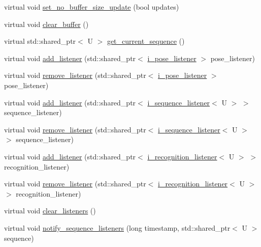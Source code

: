 \begin{DoxyCompactItemize}
\item 
virtual void \hyperlink{classmae_1_1movement__controller_a32f047751311a4e179d7cdad365bcadc}{set\-\_\-no\-\_\-buffer\-\_\-size\-\_\-update} (bool updates)
\item 
virtual void \hyperlink{classmae_1_1movement__controller_a694dc82c3222059711fa3a2ac6eb8ec2}{clear\-\_\-buffer} ()
\item 
virtual std\-::shared\-\_\-ptr$<$ U $>$ \hyperlink{classmae_1_1movement__controller_a1ce565a08a9b4efdee6b2f00b02e33e1}{get\-\_\-current\-\_\-sequence} ()
\item 
virtual void \hyperlink{classmae_1_1movement__controller_a7a150591c820312528d5b11e32646455}{add\-\_\-listener} (std\-::shared\-\_\-ptr$<$ \hyperlink{classmae_1_1i__pose__listener}{i\-\_\-pose\-\_\-listener} $>$ pose\-\_\-listener)
\item 
virtual void \hyperlink{classmae_1_1movement__controller_a5d77a42ac7427ae562d042ebbc6ce30b}{remove\-\_\-listener} (std\-::shared\-\_\-ptr$<$ \hyperlink{classmae_1_1i__pose__listener}{i\-\_\-pose\-\_\-listener} $>$ pose\-\_\-listener)
\item 
virtual void \hyperlink{classmae_1_1movement__controller_ade907e35d832e9ec5ec6fc2797df882f}{add\-\_\-listener} (std\-::shared\-\_\-ptr$<$ \hyperlink{classmae_1_1i__sequence__listener}{i\-\_\-sequence\-\_\-listener}$<$ U $>$ $>$ sequence\-\_\-listener)
\item 
virtual void \hyperlink{classmae_1_1movement__controller_af8e7fed43a0b64d09b7fbb22052ba635}{remove\-\_\-listener} (std\-::shared\-\_\-ptr$<$ \hyperlink{classmae_1_1i__sequence__listener}{i\-\_\-sequence\-\_\-listener}$<$ U $>$ $>$ sequence\-\_\-listener)
\item 
virtual void \hyperlink{classmae_1_1movement__controller_a80b292e1a12f916de2d167f22871c901}{add\-\_\-listener} (std\-::shared\-\_\-ptr$<$ \hyperlink{classmae_1_1i__recognition__listener}{i\-\_\-recognition\-\_\-listener}$<$ U $>$ $>$ recognition\-\_\-listener)
\item 
virtual void \hyperlink{classmae_1_1movement__controller_aafbffa6c9a0d2b73b2036f07c484b6cf}{remove\-\_\-listener} (std\-::shared\-\_\-ptr$<$ \hyperlink{classmae_1_1i__recognition__listener}{i\-\_\-recognition\-\_\-listener}$<$ U $>$ $>$ recognition\-\_\-listener)
\item 
virtual void \hyperlink{classmae_1_1movement__controller_adac2b632e8be6b8e2556005e79b187c3}{clear\-\_\-listeners} ()
\item 
virtual void \hyperlink{classmae_1_1movement__controller_a8e11558479a37a804102c94cfddde14d}{notify\-\_\-sequence\-\_\-listeners} (long timestamp, std\-::shared\-\_\-ptr$<$ U $>$ sequence)

\end{DoxyCompactItemize}
